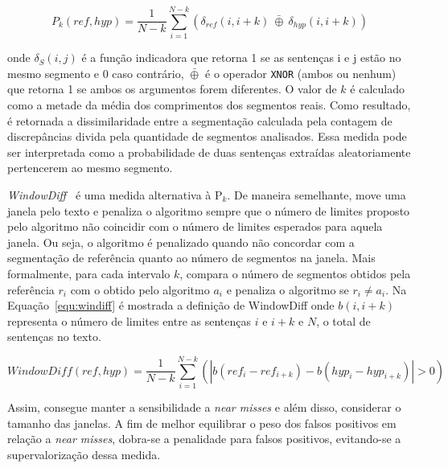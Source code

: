 \begin{equation}
P_k(ref,hyp) = \frac{1}{N - k}
\sum_{i=1}^{N-k } 
(
\delta_{ref}(i, i+k) ~
\bar{\oplus} ~
\delta_{hyp}(i, i+k) 
)
\label{equ:Pk}
\end{equation}


onde $\delta_S(i,j)$ é a função indicadora que retorna 1 se as sentenças i e j estão no mesmo segmento e 0 caso contrário, $\bar{\oplus}$ é o operador \texttt{XNOR} (ambos ou nenhum) que retorna 1 se ambos os argumentos forem diferentes. 
%
%
O valor de $k$ é calculado como a metade da média dos comprimentos dos segmentos reais. Como resultado, é retornada a dissimilaridade entre a segmentação calculada pela contagem de discrepâncias divida pela quantidade de segmentos analisados. Essa medida pode ser interpretada como a probabilidade de duas sentenças extraídas aleatoriamente pertencerem ao mesmo segmento.  





\textit{WindowDiff}~\cite{Pevzner2002} é uma medida alternativa à P$_k$. De maneira semelhante, move uma janela pelo texto e penaliza o algoritmo sempre que o número de limites proposto pelo algoritmo não coincidir com o número de limites esperados para aquela janela. Ou seja, o algoritmo é penalizado quando não concordar com a segmentação de referência quanto ao número de segmentos na janela. Mais formalmente, para cada intervalo $k$, compara o número de segmentos obtidos pela referência $r_i$ com o obtido pelo algoritmo $a_i$ e penaliza o algoritmo se $r_i \neq a_i$. Na Equação~\ref{equ:windiff} é mostrada a definição de WindowDiff onde $b(i, i+k)$ representa o número de limites entre as sentenças $i$ e $i+k$ e $N$, o total de sentenças no texto.

\begin{equation}
	WindowDiff(ref,hyp) = \frac{1}{N-k}\sum_{i=1}^{N-k}(|b(ref_i - ref_{i+k}) - b(hyp_i - hyp_{i+k})| > 0)
	\label{equ:windiff}
\end{equation}


Assim, consegue manter a sensibilidade a \textit{near misses} e além disso, considerar o tamanho das janelas.  A fim de melhor equilibrar o peso dos falsos positivos em relação a \textit{near misses}, dobra-se a penalidade para falsos positivos, evitando-se a supervalorização dessa medida.  %

